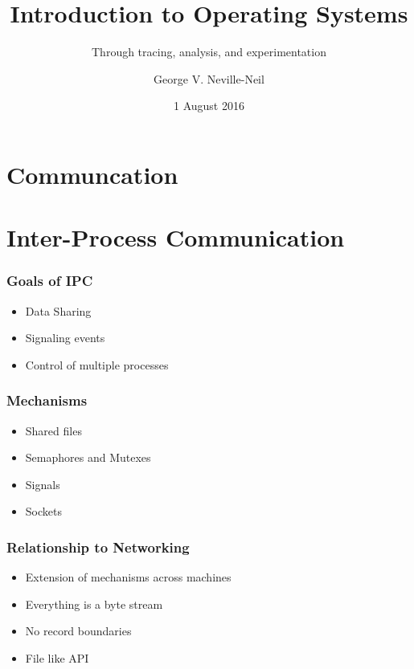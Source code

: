 \documentclass[pdftex]{beamer} %
\begin{document}

\title{Introduction to Operating Systems}
\subtitle{Through tracing, analysis, and experimentation}
\author{George V. Neville-Neil}
\date{1 August 2016}

\begin{frame}
  \titlepage
\end{frame}

\section{Communcation}
\label{sec:communication}

\section{Inter-Process Communication}
\label{sec:ipc}

\begin{frame}
  \frametitle{Goals of IPC}
  \begin{itemize}
  \item Data Sharing
  \item Signaling events
  \item Control of multiple processes
  \end{itemize}
\end{frame}

\begin{frame}
  \frametitle{Mechanisms}
  \begin{itemize}
  \item Shared files
  \item Semaphores and Mutexes
  \item Signals
  \item Sockets
  \end{itemize}
\end{frame}

\begin{frame}
  \frametitle{Relationship to Networking}
  \begin{itemize}
  \item Extension of mechanisms across machines
  \item Everything is a byte stream
  \item No record boundaries
  \item File like API
  \end{itemize}
\end{frame}
\end{document}
